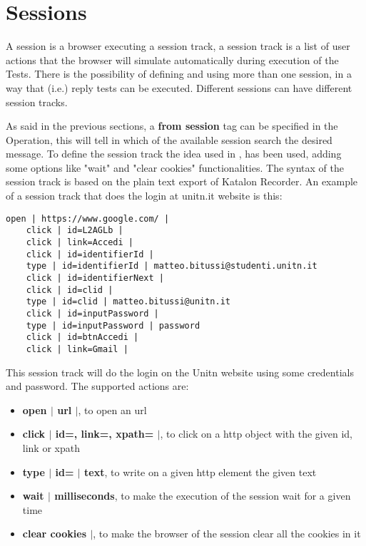 \section{Sessions}
A session is a browser executing a \gls{session track}, a \gls{session track} is a list of user actions that the browser will simulate automatically during execution of the Tests. There is the possibility of defining and using more than one session, in a way that (i.e.) reply tests can be executed. Different sessions can have different session tracks.

As said in the previous sections, a \textbf{from session} tag can be specified in the Operation, this will tell in which of the available session search the desired message. To define the \gls{session track} the idea used in \cite{giulio_pellizzari,claudio_grisenti,stefano_facchini}, has been used, adding some options like "wait" and "clear cookies" functionalities.
The syntax of the \gls{session track} is based on the plain text export of Katalon Recorder\cite{katalon_recorder_syntax}.
An example of a \gls{session track} that does the login at unitn.it website is this:

\begin{lstlisting}[caption=Session track Unitn login]
    open | https://www.google.com/ |
    click | id=L2AGLb |
    click | link=Accedi |
    click | id=identifierId |
    type | id=identifierId | matteo.bitussi@studenti.unitn.it
    click | id=identifierNext |
    click | id=clid |
    type | id=clid | matteo.bitussi@unitn.it
    click | id=inputPassword |
    type | id=inputPassword | password
    click | id=btnAccedi |
    click | link=Gmail |
\end{lstlisting}

This \gls{session track} will do the login on the Unitn website using some credentials and password. The supported actions are:
\begin{itemize}
    \item \textbf{open $|$ url $|$}, to open an url
    \item \textbf{click $|$ id=, link=, xpath= $|$}, to click on a http object with the given id, link or xpath
    \item \textbf{type $|$ id= $|$ text}, to write on a given http element the given text
    \item \textbf{wait $|$ milliseconds}, to make the execution of the session wait for a given time 
    \item \textbf{clear cookies $|$}, to make the browser of the session clear all the cookies in it
\end{itemize}


 
